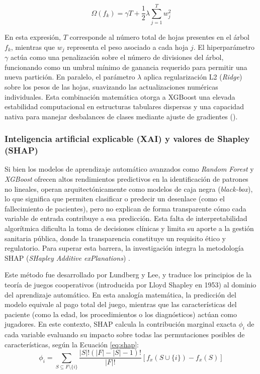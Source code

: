 \begin{equation}
    \Omega(f_k) = \gamma T + \frac{1}{2}\lambda \sum_{j=1}^{T} w_j^2
    \label{eq:xgboost_reg}
\end{equation}

En esta expresión, $T$ corresponde al número total de hojas presentes en el árbol $f_k$, mientras que $w_j$ representa el peso asociado a cada hoja $j$. El hiperparámetro $\gamma$ actúa como una penalización sobre el número de divisiones del árbol, funcionando como un umbral mínimo de ganancia requerido para permitir una nueva partición. En paralelo, el parámetro $\lambda$ aplica regularización L2 (\textit{Ridge}) sobre los pesos de las hojas, suavizando las actualizaciones numéricas individuales. Esta combinación matemática otorga a XGBoost una elevada estabilidad computacional en estructuras tabulares dispersas y una capacidad nativa para manejar desbalances de clases mediante ajuste de gradientes (\cite{chen2016xgboost}).

\subsubsection{Inteligencia artificial explicable (XAI) y valores de Shapley (SHAP)}

Si bien los modelos de aprendizaje automático avanzados como \textit{Random Forest} y \textit{XGBoost} ofrecen altos rendimientos predictivos en la identificación de patrones no lineales, operan arquitectónicamente como modelos de caja negra (\textit{black-box}), lo que significa que permiten clasificar o predecir un desenlace (como el fallecimiento de pacientes), pero no explican de forma transparente cómo cada variable de entrada contribuye a esa predicción. Esta falta de interpretabilidad algorítmica dificulta la toma de decisiones clínicas y limita su aporte a la gestión sanitaria pública, donde la transparencia constituye un requisito ético y regulatorio. Para superar esta barrera, la investigación integra la metodología SHAP (\textit{SHapley Additive exPlanations}) \cite{lundberg2017shap}.

Este método fue desarrollado por Lundberg y Lee, y traduce los principios de la teoría de juegos cooperativos (introducida por Lloyd Shapley en 1953) al dominio del aprendizaje automático. En esta analogía matemática, la predicción del modelo equivale al pago total del juego, mientras que las características del paciente (como la edad, los procedimientos o los diagnósticos) actúan como jugadores. En este contexto, SHAP calcula la contribución marginal exacta $\phi_i$ de cada variable evaluando su impacto sobre todas las permutaciones posibles de características, según la Ecuación \ref{eq:shap}:
\begin{equation}
    \phi_i = \sum_{S \subseteq F \setminus \{i\}} \frac{|S|! (|F| - |S| - 1)!}{|F|!} [f_x(S \cup \{i\}) - f_x(S)]
    \label{eq:shap}
\end{equation}

